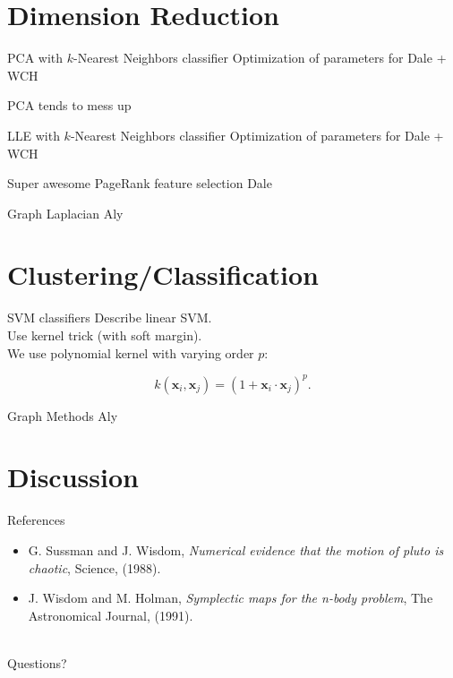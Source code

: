 \documentclass[xcolor=dvipsnames,t]{beamer} %
\begin{document}
\section{Dimension Reduction}
\begin{frame}{PCA with $k$-Nearest Neighbors classifier}
Optimization of parameters for Dale + WCH

PCA tends to mess up 
\end{frame}

\begin{frame}{LLE with $k$-Nearest Neighbors classifier}
Optimization of parameters for Dale + WCH
\end{frame}

\begin{frame}{Super awesome PageRank feature selection}
Dale
\end{frame}

\begin{frame}{Graph Laplacian}
Aly
\end{frame}



\section{Clustering/Classification}
\begin{frame}{SVM classifiers}
Describe linear SVM.\\
Use kernel trick (with soft margin).\\
We use polynomial kernel with varying order $p$:

\[ k(\mathbf{x}_i,\mathbf{x}_j) = \left(1 + \mathbf{x}_i\cdot\mathbf{x}_j\right)^p. \] 

\end{frame}

\begin{frame}{Graph Methods}
Aly
\end{frame}


\section{Discussion}

\begin{frame}{References}
   \begin{itemize}
      \item G. Sussman and J. Wisdom, \emph{Numerical evidence that the motion of pluto is chaotic}, Science, (1988).\\
      \item J. Wisdom and M. Holman, \emph{Symplectic maps for the n-body problem}, The Astronomical Journal, (1991).\\
   \end{itemize}
   ~\\
   Questions?

\end{frame}
\end{document}
